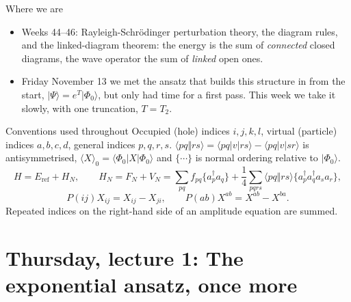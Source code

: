 \documentclass[aspectratio=169,10pt]{beamer}
\newcommand{\ket}[1]{\vert #1\rangle}
\newcommand{\mel}[3]{\langle #1\lvert #2\rvert #3\rangle}
\newcommand{\av}[1]{\langle #1\rangle_0}
\newcommand{\cre}[1]{a_{#1}^{\dagger}}
\newcommand{\ann}[1]{a_{#1}}
\newcommand{\no}[1]{\bigl\{#1\bigr\}}
\newcommand{\Eref}{E_{\mathrm{ref}}}
\newcommand{\ph}{\Phi_0}
\newcommand{\as}[4]{\langle #1#2\Vert #3#4\rangle}
\begin{document}
\begin{frame}[shrink=7]{Where we are}
\begin{itemize}
\item Weeks 44--46: Rayleigh-Schr\"odinger perturbation theory, the diagram rules, and the linked-diagram theorem: the energy is the sum of \emph{connected} closed diagrams, the wave operator the sum of \emph{linked} open ones.
\item Friday November 13 we met the ansatz that builds this structure in from the start, $\ket{\Psi}=e^{T}\ket{\ph}$, but only had time for a first pass. This week we take it slowly, with one truncation, $T=T_2$.
\end{itemize}
\begin{block}{Conventions used throughout}
Occupied (hole) indices $i,j,k,l$, virtual (particle) indices $a,b,c,d$, general indices $p,q,r,s$. $\as{p}{q}{r}{s}=\mel{pq}{v}{rs}-\mel{pq}{v}{sr}$ is antisymmetrised, $\av X=\mel{\ph}{X}{\ph}$ and $\no{\cdots}$ is normal ordering relative to $\ket{\ph}$.
\[
 H=\Eref+H_N,\qquad H_N=F_N+V_N=\sum_{pq}f_{pq}\no{\cre p\ann q}
 +\frac14\sum_{pqrs}\as pqrs\no{\cre p\cre q\ann s\ann r},
\]
\[
 P(ij)X_{ij}=X_{ij}-X_{ji},\qquad P(ab)X^{ab}=X^{ab}-X^{ba}.
\]
Repeated indices on the right-hand side of an amplitude equation are summed.
\end{block}
\end{frame}

\section[Thursday 1: The ansatz]{Thursday, lecture 1: The exponential ansatz, once more}
\end{document}
